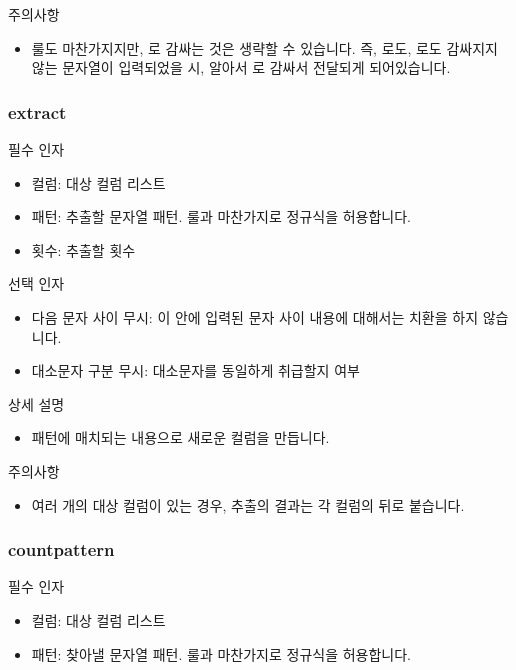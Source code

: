 \documentclass[letterpaper,10pt,english]{sphinxmanual}
\begin{document}
주의사항
\begin{itemize}
\item {} 
{\hyperref[\detokenize{discovery/part07/rule_kinds:replace}]{}} 룰도 마찬가지지만,  로 감싸는 것은 생략할 수 있습니다. 즉, \sphinxcode{\sphinxupquote{/}} 로도,  로도 감싸지지 않는 문자열이 입력되었을 시, 알아서  로 감싸서 전달되게 되어있습니다.

\end{itemize}


\subsubsection{extract}
\label{\detokenize{discovery/part07/rule_kinds:extract}}
필수 인자
\begin{itemize}
\item {} 
컬럼: 대상 컬럼 리스트

\item {} 
패턴: 추출할 문자열 패턴. {\hyperref[\detokenize{discovery/part07/rule_kinds:replace}]{}} 룰과 마찬가지로 정규식을 허용합니다.

\item {} 
횟수: 추출할 횟수

\end{itemize}

선택 인자
\begin{itemize}
\item {} 
다음 문자 사이 무시: 이 안에 입력된 문자 사이 내용에 대해서는 치환을 하지 않습니다.

\item {} 
대소문자 구분 무시: 대소문자를 동일하게 취급할지 여부

\end{itemize}

상세 설명
\begin{itemize}
\item {} 
패턴에 매치되는 내용으로 새로운 컬럼을 만듭니다.

\end{itemize}

주의사항
\begin{itemize}
\item {} 
여러 개의 대상 컬럼이 있는 경우, 추출의 결과는 각 컬럼의 뒤로 붙습니다.

\end{itemize}


\subsubsection{countpattern}
\label{\detokenize{discovery/part07/rule_kinds:countpattern}}
필수 인자
\begin{itemize}
\item {} 
컬럼: 대상 컬럼 리스트

\item {} 
패턴: 찾아낼 문자열 패턴. {\hyperref[\detokenize{discovery/part07/rule_kinds:replace}]{}} 룰과 마찬가지로 정규식을 허용합니다.

\end{itemize}
\end{document}
